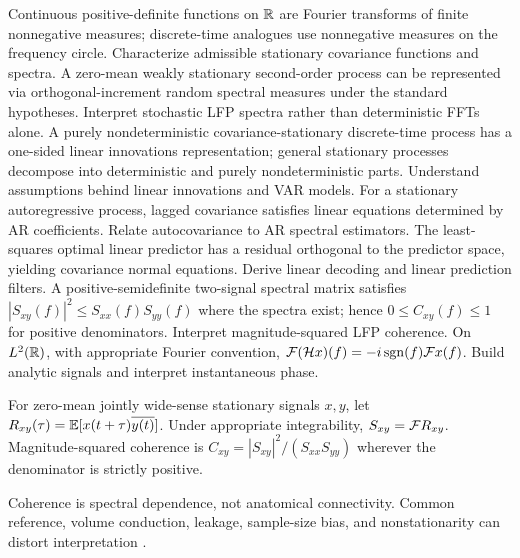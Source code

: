 {Continuous positive-definite functions on $\mathbb{R}$ are Fourier
transforms of finite nonnegative measures; discrete-time analogues
use nonnegative measures on the frequency circle.}
{Characterize admissible stationary covariance functions and spectra.}
{A zero-mean weakly stationary second-order process can be
represented via orthogonal-increment random spectral measures
under the standard hypotheses.}
{Interpret stochastic LFP spectra rather than deterministic FFTs alone.}
{A purely nondeterministic covariance-stationary discrete-time
process has a one-sided linear innovations representation;
general stationary processes decompose into deterministic and
purely nondeterministic parts.}
{Understand assumptions behind linear innovations and VAR models.}
{For a stationary autoregressive process, lagged covariance
satisfies linear equations determined by AR coefficients.}
{Relate autocovariance to AR spectral estimators.}
{The least-squares optimal linear predictor has a residual
orthogonal to the predictor space, yielding covariance normal equations.}
{Derive linear decoding and linear prediction filters.}
{A positive-semidefinite two-signal spectral matrix satisfies
$|S_{xy}(f)|^2\leq S_{xx}(f)S_{yy}(f)$ where the spectra exist;
hence $0\leq C_{xy}(f)\leq1$ for positive denominators.}
{Interpret magnitude-squared LFP coherence.}
{On $L^2(\mathbb{R})$, with appropriate Fourier convention,
$\mathcal{F}(\mathcal{H} x)(f)=-i\operatorname{sgn}(f)\mathcal{F} x(f)$.}
{Build analytic signals and interpret instantaneous phase.}

\begin{definition}
For zero-mean jointly wide-sense stationary signals $x,y$,
let $R_{xy}(\tau)=\mathbb{E}[x(t+\tau)\overline{y(t)}]$.
Under appropriate integrability, $S_{xy}=\mathcal{F} R_{xy}$.
Magnitude-squared coherence is
$C_{xy}=|S_{xy}|^2/(S_{xx}S_{yy})$ wherever the
denominator is strictly positive.
\end{definition}
\begin{caution}
Coherence is spectral dependence, not anatomical connectivity.
Common reference, volume conduction, leakage, sample-size bias,
and nonstationarity can distort interpretation
\cite{bastos2016,cohen2018}.
\end{caution}
